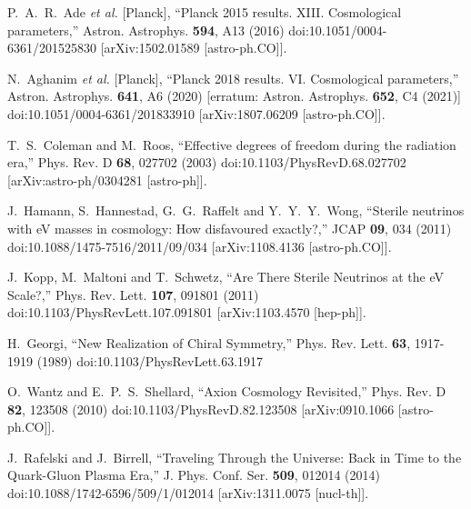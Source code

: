 \documentclass[universe,article,submit,moreauthors,pdftex,a4paper]{Definitions/mdpi}
\begin{document}
\begin{thebibliography}{99}
P.~A.~R.~Ade \textit{et al.} [Planck],
``Planck 2015 results. XIII. Cosmological parameters,''
Astron. Astrophys. \textbf{594}, A13 (2016)
doi:10.1051/0004-6361/201525830
[arXiv:1502.01589 [astro-ph.CO]].

N.~Aghanim \textit{et al.} [Planck],
``Planck 2018 results. VI. Cosmological parameters,''
Astron. Astrophys. \textbf{641}, A6 (2020)
[erratum: Astron. Astrophys. \textbf{652}, C4 (2021)]
doi:10.1051/0004-6361/201833910
[arXiv:1807.06209 [astro-ph.CO]].

T.~S.~Coleman and M.~Roos,
``Effective degrees of freedom during the radiation era,''
Phys. Rev. D \textbf{68}, 027702 (2003)
doi:10.1103/PhysRevD.68.027702
[arXiv:astro-ph/0304281 [astro-ph]].

J.~Hamann, S.~Hannestad, G.~G.~Raffelt and Y.~Y.~Y.~Wong,
``Sterile neutrinos with eV masses in cosmology: How disfavoured exactly?,''
JCAP \textbf{09}, 034 (2011)
doi:10.1088/1475-7516/2011/09/034
[arXiv:1108.4136 [astro-ph.CO]].

J.~Kopp, M.~Maltoni and T.~Schwetz,
``Are There Sterile Neutrinos at the eV Scale?,''
Phys. Rev. Lett. \textbf{107}, 091801 (2011)
doi:10.1103/PhysRevLett.107.091801
[arXiv:1103.4570 [hep-ph]].

H.~Georgi,
``New Realization of Chiral Symmetry,''
Phys. Rev. Lett. \textbf{63}, 1917-1919 (1989)
doi:10.1103/PhysRevLett.63.1917

O.~Wantz and E.~P.~S.~Shellard,
``Axion Cosmology Revisited,''
Phys. Rev. D \textbf{82}, 123508 (2010)
doi:10.1103/PhysRevD.82.123508
[arXiv:0910.1066 [astro-ph.CO]].

J.~Rafelski and J.~Birrell,
``Traveling Through the Universe: Back in Time to the Quark-Gluon Plasma Era,''
J. Phys. Conf. Ser. \textbf{509}, 012014 (2014)
doi:10.1088/1742-6596/509/1/012014
[arXiv:1311.0075 [nucl-th]].


\end{thebibliography}
\end{document}
